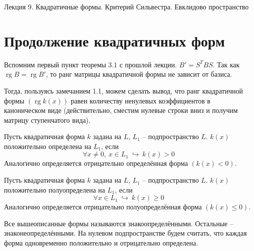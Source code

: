 \documentclass[11pt]{article}
\DeclareMathOperator{\rg}{rg}
\begin{document}
\begin{titlepage}
    \centering
    \vspace*{\fill}  %

    {\Huge Лекция 9. Квадратичные формы. Критерий Сильвестра. Евклидово пространство
    \par}

    \vspace*{\fill}  %
\end{titlepage}

\setcounter{page}{1}

\section{Продолжение квадратичных форм}

\begin{remark}
  Вспомним первый пункт теоремы 3.1 с прошлой лекции. $B' = S^TBS$. 
  Так как $\rg B = \rg B'$, то ранг матрицы квадратичной формы не 
  зависит от базиса.
\end{remark}

\begin{remark}
  Тогда, пользуясь замечанием 1.1, можем сделать вывод, что ранг 
  квадратичной формы $(\rg k(x))$ равен количеству ненулевых 
  коэффициентов в каноническом виде (действительно, сместим нулевые 
  строки вниз и получим матрицу ступенчатого вида).
\end{remark}

\begin{definition}
  Пусть квадратичная форма $k$ задана на $L$, $L_1$ -- подпространство 
  $L$. $k(x)$ положительно определена на $L_1$, если 
  \[\forall x \neq 0, \ x \in L_1 \ \hookrightarrow \ k(x) > 0\]
  Аналогично определяется отрицательно определённая форма $(k(x) < 0)$.
\end{definition}

\begin{definition}
  Пусть квадратичная форма $k$ задана на $L$, $L_1$ -- подпространство 
  $L$. $k(x)$ положительно полуопределена на $L_1$, если 
  \[\forall x \in L_1 \ \hookrightarrow \ k(x) \geq 0\]
  Аналогично определяется отрицательно полуопределённая форма $(k(x) \leq 0)$.
\end{definition}

\begin{remark}
  Все вышеописанные формы называются знакоопределёнными. Остальные -- 
  знаконеопределёнными. На нулевом подпространстве будем считать, что 
  каждая форма одновременно положительно и отрицательно определена.
\end{remark}
\end{document}
